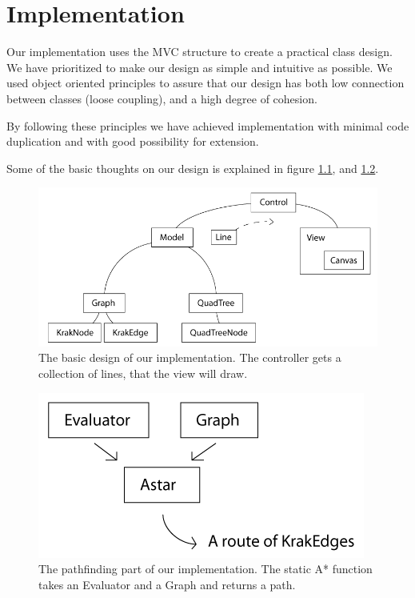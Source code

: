 \chapter{Implementation}
\label{IMPL}
Our implementation uses the MVC structure to create a practical class design. We
have prioritized to make our design as simple and intuitive as possible. We used
object oriented principles to assure that our design has both low connection
between classes (loose coupling), and a high degree of cohesion.

By following these principles we have achieved implementation with minimal code
duplication and with good possibility for extension.

Some of the basic thoughts on our design is explained in figure
\ref{fig:BasicDesign}, and \ref{fig:PathfindingStructure}.

\begin{figure}[h!]
\centering
\includegraphics[width=1\linewidth]{images/BasicDesign}
\caption{The basic design of our implementation. The controller gets a
collection of lines, that the view will draw.}
\label{fig:BasicDesign}
\end{figure}

\begin{figure}[h!]
\centering
\includegraphics[width=0.5\linewidth]{images/PathfindingStructure}
\caption{The pathfinding part of our implementation. The static A* function
takes an Evaluator and a Graph and returns a path.}
\label{fig:PathfindingStructure}
\end{figure}

